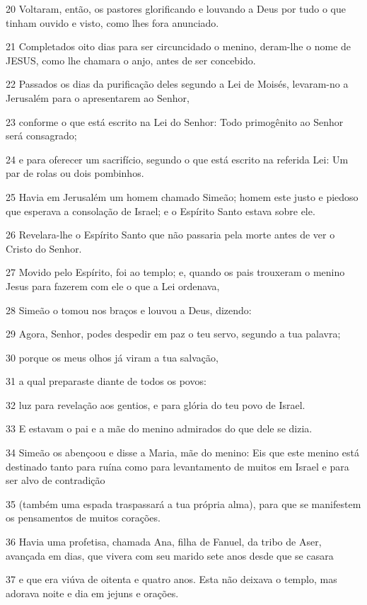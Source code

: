 \par 20 Voltaram, então, os pastores glorificando e louvando a Deus por tudo o que tinham ouvido e visto, como lhes fora anunciado.
\par 21 Completados oito dias para ser circuncidado o menino, deram-lhe o nome de JESUS, como lhe chamara o anjo, antes de ser concebido.
\par 22 Passados os dias da purificação deles segundo a Lei de Moisés, levaram-no a Jerusalém para o apresentarem ao Senhor,
\par 23 conforme o que está escrito na Lei do Senhor: Todo primogênito ao Senhor será consagrado;
\par 24 e para oferecer um sacrifício, segundo o que está escrito na referida Lei: Um par de rolas ou dois pombinhos.
\par 25 Havia em Jerusalém um homem chamado Simeão; homem este justo e piedoso que esperava a consolação de Israel; e o Espírito Santo estava sobre ele.
\par 26 Revelara-lhe o Espírito Santo que não passaria pela morte antes de ver o Cristo do Senhor.
\par 27 Movido pelo Espírito, foi ao templo; e, quando os pais trouxeram o menino Jesus para fazerem com ele o que a Lei ordenava,
\par 28 Simeão o tomou nos braços e louvou a Deus, dizendo:
\par 29 Agora, Senhor, podes despedir em paz o teu servo, segundo a tua palavra;
\par 30 porque os meus olhos já viram a tua salvação,
\par 31 a qual preparaste diante de todos os povos:
\par 32 luz para revelação aos gentios, e para glória do teu povo de Israel.
\par 33 E estavam o pai e a mãe do menino admirados do que dele se dizia.
\par 34 Simeão os abençoou e disse a Maria, mãe do menino: Eis que este menino está destinado tanto para ruína como para levantamento de muitos em Israel e para ser alvo de contradição
\par 35 (também uma espada traspassará a tua própria alma), para que se manifestem os pensamentos de muitos corações.
\par 36 Havia uma profetisa, chamada Ana, filha de Fanuel, da tribo de Aser, avançada em dias, que vivera com seu marido sete anos desde que se casara
\par 37 e que era viúva de oitenta e quatro anos. Esta não deixava o templo, mas adorava noite e dia em jejuns e orações.
